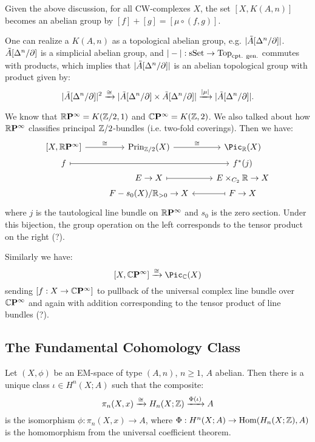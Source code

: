 

Given the above discussion, for all CW-complexes $X$, the set $[X,K(A,n)]$ becomes an abelian group by $[f]+[g]=[\mu\circ(f,g)]$.

\begin{remark}
One can realize a $K(A,n)$ as a topological abelian group, e.g. $|\tilde A[\Delta^n/\partial]|$. $\tilde A[\Delta^n/\partial]$ is a simplicial abelian group, and $|-|:{\mathrm{sSet}}\to{\mathrm{Top}}_\text{cpt. gen.}$ commutes with products, which implies that $|\tilde A[\Delta^n/\partial]|$ is an abelian topological group with product given by:
\[|\tilde A[\Delta^n/\partial]|^2\xrightarrow{\cong}|\tilde A[\Delta^n/\partial]\times\tilde A[\Delta^n/\partial]|\xrightarrow{|\mu|}|\tilde A[\Delta^n/\partial]|.\]
\end{remark}

\begin{example}
We know that ${{\mathbb R}\mathbf{P}^{\infty}}=K({\mathbb Z}/2,1)$ and ${\mathbb{C}\mathbf{P}^{\infty}}=K({\mathbb Z},2)$. We also talked about how ${{\mathbb R}\mathbf{P}^{\infty}}$ classifies principal ${\mathbb Z}/2$-bundles (i.e. two-fold coverings). Then we have:
\[
\begin{tikzcd}
    \left[X,\rp{\infty}\right] \ar[r,"\cong"] & \operatorname{Prin}_{\Z/2}(X) \ar[r,"\cong"] & \Pic_\R(X)\\[-4ex]
    f \ar[rr,mapsto] & & f^* (j)\\[-4ex]
    & E\to X \ar[r,mapsto] & E\times_{C_2}\R\to X\\[-4ex]
    & F-s_0(X)/\R_{>0}\to X & F\to X \ar[l,mapsto]
\end{tikzcd}
\]
where $j$ is the tautological line bundle on ${{\mathbb R}\mathbf{P}^{\infty}}$ and $s_0$ is the zero section. Under this bijection, the group operation on the left corresponds to the tensor product on the right (?).

Similarly we have:
\[[X,\cp{\infty}]\xto{\cong}\Pic_\CC(X)\]
sending $[f:X\to{\mathbb{C}\mathbf{P}^{\infty}}]$ to pullback of the universal complex line bundle over ${\mathbb{C}\mathbf{P}^{\infty}}$ and again with addition corresponding to the tensor product of line bundles (?).
\end{example}

\subsection{The Fundamental Cohomology Class}

\begin{propdef}\label{propdef:fundamental-cohomology-class}
Let $(X,\phi)$ be an EM-space of type $(A,n)$, $n\ge1$, $A$ abelian. Then there is a unique class $\iota\in H^n(X;A)$ such that the composite:
\[\pi_n(X,x)\xrightarrow{\cong}H_n(X;{\mathbb Z})\xrightarrow{\Phi(\iota)}A\]
is the isomorphism $\phi:\pi_n(X,x)\to A$, where $\Phi:H^n(X;A)\to\operatorname{Hom}(H_n(X;{\mathbb Z}),A)$ is the homomorphism from the universal coefficient theorem.
\end{propdef}

